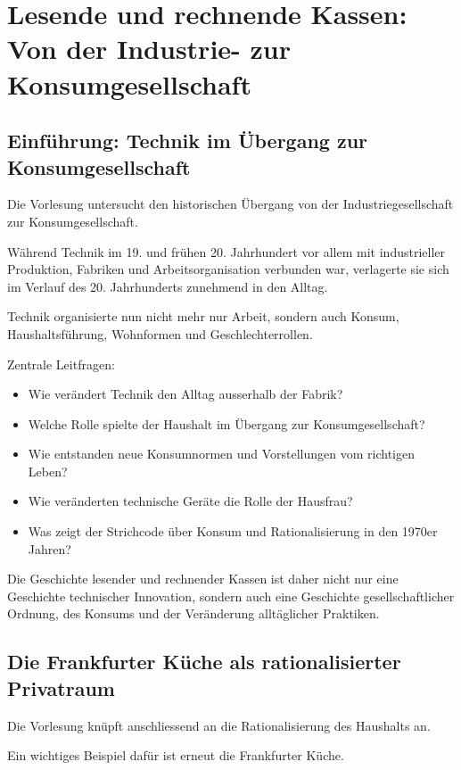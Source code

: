 \section{Lesende und rechnende Kassen: Von der Industrie- zur Konsumgesellschaft}

\subsection{Einführung: Technik im Übergang zur Konsumgesellschaft}

Die Vorlesung untersucht den historischen Übergang
von der Industriegesellschaft zur Konsumgesellschaft.

Während Technik im 19. und frühen 20. Jahrhundert
vor allem mit industrieller Produktion,
Fabriken und Arbeitsorganisation verbunden war,
verlagerte sie sich im Verlauf des 20. Jahrhunderts
zunehmend in den Alltag.

Technik organisierte nun nicht mehr nur Arbeit,
sondern auch Konsum,
Haushaltsführung,
Wohnformen und Geschlechterrollen.

Zentrale Leitfragen:

\begin{itemize}
\item Wie verändert Technik den Alltag ausserhalb der Fabrik?
\item Welche Rolle spielte der Haushalt im Übergang zur Konsumgesellschaft?
\item Wie entstanden neue Konsumnormen und Vorstellungen vom richtigen Leben?
\item Wie veränderten technische Geräte die Rolle der Hausfrau?
\item Was zeigt der Strichcode über Konsum und Rationalisierung in den 1970er Jahren?
\end{itemize}

Die Geschichte lesender und rechnender Kassen
ist daher nicht nur eine Geschichte technischer Innovation,
sondern auch eine Geschichte gesellschaftlicher Ordnung,
des Konsums und der Veränderung alltäglicher Praktiken.

\subsection{Die Frankfurter Küche als rationalisierter Privatraum}

Die Vorlesung knüpft anschliessend
an die Rationalisierung des Haushalts an.

Ein wichtiges Beispiel dafür ist erneut
die Frankfurter Küche.

